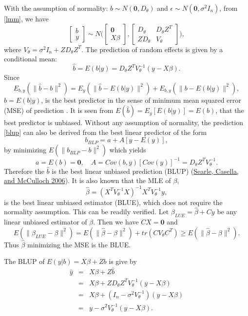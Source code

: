 \documentclass[
]{article}
\begin{document}
With the assumption of normality: \(b\sim N(\mathbf{0}, D_{\theta})\)
and \(\epsilon\sim N(\mathbf{0}, \sigma^2I_n)\), from \eqref{lmm}, we
have \[
\begin{bmatrix}
b\\y
\end{bmatrix}
\sim N\Big(
\begin{bmatrix} \mathbf{0}\\X\beta \end{bmatrix},
\begin{bmatrix} D_{\theta}&D_{\theta}Z^T\\ZD_{\theta}&V_{\theta}\end{bmatrix}
\Big),
\] where \(V_{\theta} = \sigma^2I_n + ZD_{\theta}Z^T\). The prediction
of random effects is given by a conditional mean:
\begin{equation}\label{blup}
\hat b = E(b|y) = D_{\theta}Z^TV_{\theta}^{-1}(y-X\beta).
\end{equation} Since
\[E_{b,y}(\parallel\hat b - b\parallel^2) = E_y(\parallel\hat b - E(b|y)\parallel^2) + E_{b,y}(\parallel b - E(b|y)\parallel^2) ,\]
\(\hat b = E(b|y)\), is the best predictor in the sense of minimum mean
squared error (MSE) of prediction . It is seen from
\(E(\hat b) = E_y[E(b|y)] = E(b)\), that the best predictor is unbiased.
Without any assumption of normality, the prediction \eqref{blup} can
also be derived from the best linear predictor of the form
\[b_{BLP} = a + A[y-E(y)],\] by minimizing
\(E(\parallel b_{BLP} - b\parallel^2)\) which yields
\[a = E(b) = \mathbf{0}, \quad A = Cov(b, y)[Cov(y)]^{-1} = D_{\theta}Z^TV_{\theta}^{-1}.\]
Therefore the \(\hat b\) is the best linear unbiased prediction (BLUP)
(\protect\hyperlink{ref-Searle2006}{Searle, Casella, and McCulloch
2006}). It is also known that the MLE of \(\beta\),
\[\hat\beta = (X^TV_{\theta}^{-1}X )^{-1}X^TV_{\theta}^{-1}y,\] is the
best linear unbiased estimator (BLUE), which does not require the
normality assumption. This can be readily verified. Let
\(\beta_{LUE} = \hat\beta + Cy\) be any linear unbiased estimator of
\(\beta\). Then we have \(CX = \mathbf{0}\) and
\[E(\parallel\beta_{LUE} - \beta\parallel^2) = E(\parallel\hat\beta- \beta\parallel^2) + tr(CV_{\theta}C^T) \ge E(\parallel\hat\beta- \beta\parallel^2).\]
Thus \(\hat\beta\) minimizing the MSE is the BLUE.

The BLUP of \(E(y|b) = X\beta + Zb\) is give by
\begin{equation}\label{yblup}
\begin{array}{rcl}
\hat y 
&=& X\beta + Z\hat b\\
&=& X\beta + ZD_{\theta}Z^TV_{\theta}^{-1}(y-X\beta)\\
&=& X\beta + (I_n - \sigma^2 V_{\theta}^{-1})(y-X\beta)\\
&=& y - \sigma^2V_{\theta}^{-1}(y-X\beta).
\end{array}
\end{equation}
\end{document}
